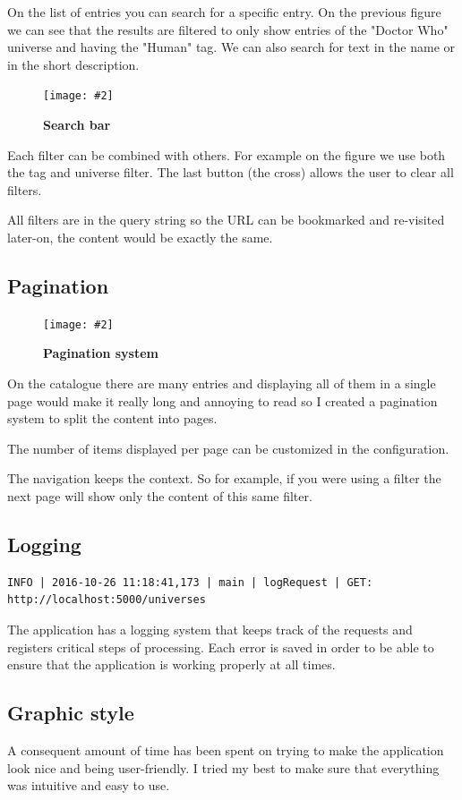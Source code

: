 \documentclass[10pt, a4paper]{article}
\newcommand{\figuremacro}[5]{
    \begin{figure}[#1]
        \centering
        \texttt{[image: \#2]}
        \caption[#3]{\textbf{#3}#4}
        \label{fig:#2}
    \end{figure}
}
\begin{document}
	On the list of entries you can search for a specific entry. On the previous figure we can see that the results are filtered to only show entries of the "Doctor Who" universe and having the "Human" tag. We can also search for text in the name or in the short description.
	
	\figuremacro{h}{SearchSystem}{Search bar}{}{0.8}
	
	Each filter can be combined with others. For example on the figure we use both the tag and universe filter. The last button (the cross) allows the user to clear all filters.
	
	All filters are in the query string so the URL can be bookmarked and re-visited later-on, the content would be exactly the same.
	
	\subsection{Pagination}
	
	\figuremacro{h}{Pagination}{Pagination system}{}{0.2}
	
	On the catalogue there are many entries and displaying all of them in a single page would make it really long and annoying to read so I created a pagination system to split the content into pages.
	
	The number of items displayed per page can be customized in the configuration.
	
	The navigation keeps the context. So for example, if you were using a filter the next page will show only the content of this same filter.
	
	\subsection{Logging}
	
	\begin{lstlisting}[caption = A line of the log file]
	INFO | 2016-10-26 11:18:41,173 | main | logRequest | GET: http://localhost:5000/universes\end{lstlisting}
	
	The application has a logging system that keeps track of the requests and registers critical steps of processing. Each error is saved in order to be able to ensure that the application is working properly at all times.
	
	\subsection{Graphic style}
	A consequent amount of time has been spent on trying to make the application look nice and being user-friendly. I tried my best to make sure that everything was intuitive and easy to use.
	
\end{document}
